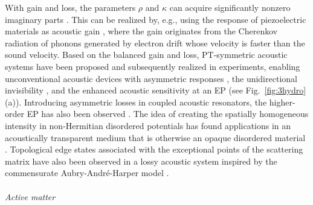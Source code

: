\documentclass{tADP2e}
\theoremstyle{plain}
\theoremstyle{plain}
\theoremstyle{definition}
\begin{document}
With gain and loss, the parameters $\rho$ and $\kappa$ can acquire significantly nonzero imaginary parts \cite{FR15,AY17}. This can be realized by, e.g., using  the response of piezoelectric materials as acoustic gain \cite{WM14}, where the gain originates from the Cherenkov radiation of phonons generated by electron drift whose velocity is faster than the sound velocity. 
Based on the balanced gain and loss, PT-symmetric acoustic systems have been proposed \cite{ZX14} and subsequently realized in experiments, enabling unconventional acoustic devices with asymmetric responses \cite{SDL15}, the unidirectional invisibility \cite{AY17,CJ16,SC16}, and the enhanced acoustic sensitivity at an EP \cite{FR15} (see Fig.~\ref{fig:3hydro}(a)).
Introducing asymmetric losses in coupled acoustic resonators, the higher-order EP has also been observed \cite{DK162}. 
The idea of creating the spatially homogeneous intensity in non-Hermitian disordered potentials \cite{MKG15,MKG17} has found applications in an acoustically transparent medium that is otherwise an opaque disordered material \cite{RE17,RE18}. Topological edge states associated with the exceptional points of the scattering matrix have also been observed in a lossy acoustic system inspired by the commensurate Aubry-Andr\'e-Harper model \cite{ZW18}.
\\ \\ {\it Active matter}
\end{document}
